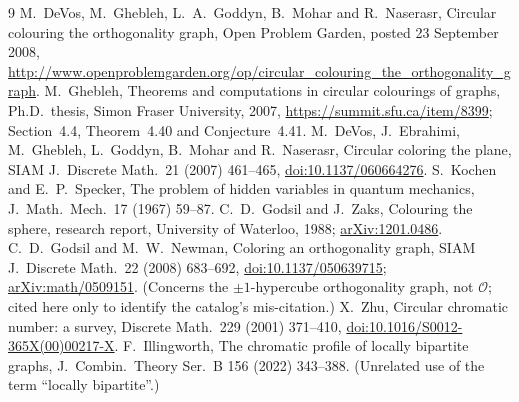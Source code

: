 \documentclass[11pt,a4paper]{article}
\theoremstyle{plain}
\theoremstyle{definition}
\theoremstyle{remark}
\newcommand{\cO}{\mathcal O}
\begin{document}
\begin{thebibliography}{9}
\small
\setlength{\itemsep}{2pt}
 M.~DeVos, M.~Ghebleh, L.~A.~Goddyn, B.~Mohar and R.~Naserasr, Circular colouring the orthogonality graph, Open Problem Garden, posted 23 September 2008, \url{http://www.openproblemgarden.org/op/circular_colouring_the_orthogonality_graph}.
 M.~Ghebleh, Theorems and computations in circular colourings of graphs, Ph.D.\ thesis, Simon Fraser University, 2007, \url{https://summit.sfu.ca/item/8399}; Section~4.4, Theorem~4.40 and Conjecture~4.41.
 M.~DeVos, J.~Ebrahimi, M.~Ghebleh, L.~Goddyn, B.~Mohar and R.~Naserasr, Circular coloring the plane, SIAM J.\ Discrete Math.\ 21 (2007) 461--465, \href{https://doi.org/10.1137/060664276}{doi:10.1137/060664276}.
 S.~Kochen and E.~P.~Specker, The problem of hidden variables in quantum mechanics, J.\ Math.\ Mech.\ 17 (1967) 59--87.
 C.~D.~Godsil and J.~Zaks, Colouring the sphere, research report, University of Waterloo, 1988; \href{https://arxiv.org/abs/1201.0486}{arXiv:1201.0486}.
 C.~D.~Godsil and M.~W.~Newman, Coloring an orthogonality graph, SIAM J.\ Discrete Math.\ 22 (2008) 683--692, \href{https://doi.org/10.1137/050639715}{doi:10.1137/050639715}; \href{https://arxiv.org/abs/math/0509151}{arXiv:math/0509151}. (Concerns the $\pm1$-hypercube orthogonality graph, not $\cO$; cited here only to identify the catalog's mis-citation.)
 X.~Zhu, Circular chromatic number: a survey, Discrete Math.\ 229 (2001) 371--410, \href{https://doi.org/10.1016/S0012-365X(00)00217-X}{doi:10.1016/S0012-365X(00)00217-X}.
 F.~Illingworth, The chromatic profile of locally bipartite graphs, J.\ Combin.\ Theory Ser.\ B 156 (2022) 343--388. (Unrelated use of the term ``locally bipartite''.)
\end{thebibliography}
\end{document}
